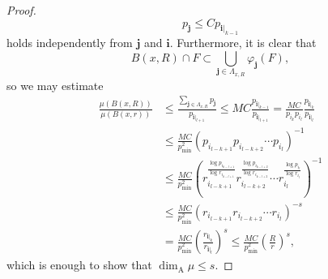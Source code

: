 \documentclass{PRM}
\theoremstyle{plain}
\theoremstyle{definition}
\theoremstyle{remark}
\begin{document}
\begin{proof}
\begin{equation*}
    p_{\mathbf{j}}\leq Cp_{\mathbf{i}|_{k-1}}
\end{equation*}
holds independently from $\mathbf{j}$ and $\mathbf{i}$.
Furthermore, it is clear that
\begin{equation*}
    B(x,R)\cap F\subset\bigcup_{\mathbf{j}\in\Lambda_{x,R}}\varphi_{\mathbf{j}}(F),
\end{equation*}
so we may estimate
\begin{align*}
    \frac{\mu(B(x,R))}{\mu(B(x,r))}&\leq \frac{\sum_{\mathbf{j}\in\Lambda_{x,R}}p_{\mathbf{j}}}{p_{\mathbf{i}|_{l+1}}}\leq MC\frac{p_{\mathbf{i}|_{k-1}}}{p_{\mathbf{i}|_{l+1}}}=\frac{MC}{p_{i_k}p_{i_l}}\frac{p_{\mathbf{i}|_k}}{p_{\mathbf{i}|_l}}\\
    &\leq \frac{MC}{p_{\min}^2}\left(p_{i_{l-k+1}}p_{i_{l-k+2}}\cdots p_{i_l}\right)^{-1}\\
    &\leq \frac{MC}{p_{\min}^2}\left(r_{i_{l-k+1}}^{\frac{\log p_{i_{k-l+1}}}{\log r_{i_{k-l+1}}}}r_{i_{l-k+2}}^{\frac{\log p_{i_{k-l+2}}}{\log r_{i_{k-l+2}}}}\cdots r_{i_l}^{\frac{\log p_{i_{l}}}{\log r_{i_{l}}}}\right)^{-1}\\
    &\leq \frac{MC}{p_{\min}^2}\left(r_{i_{l-k+1}}r_{i_{l-k+2}}\cdots r_{i_l}\right)^{-s}\\&=\frac{MC}{p_{\min}^2}\left(\frac{r_{\mathbf{i}|_{k}}}{r_{\mathbf{i}|_l}}\right)^{s}
    \leq  \frac{MC}{p_{\min}^2}\left(\frac{R}{r}\right)^{s},
\end{align*}
which is enough to show that $\dim_{\mathrm{A}}\mu\leq s$.


\end{proof}
\end{document}
